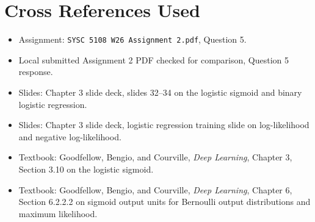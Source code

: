 \documentclass[11pt]{article}
\begin{document}
\section*{Cross References Used}

\begin{itemize}
\item Assignment: \texttt{SYSC 5108 W26 Assignment 2.pdf}, Question 5.
\item Local submitted Assignment 2 PDF checked for comparison, Question 5 response.
\item Slides: Chapter 3 slide deck, slides 32--34 on the logistic sigmoid and binary logistic regression.
\item Slides: Chapter 3 slide deck, logistic regression training slide on log-likelihood and negative log-likelihood.
\item Textbook: Goodfellow, Bengio, and Courville, \textit{Deep Learning}, Chapter 3, Section 3.10 on the logistic sigmoid.
\item Textbook: Goodfellow, Bengio, and Courville, \textit{Deep Learning}, Chapter 6, Section 6.2.2.2 on sigmoid output units for Bernoulli output distributions and maximum likelihood.
\end{itemize}
\end{document}

